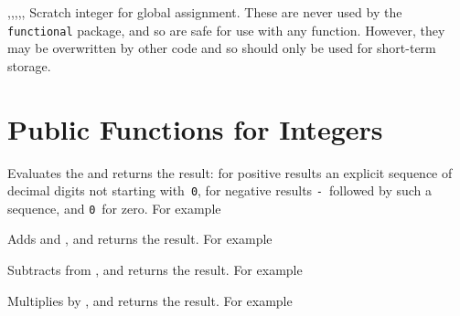\documentclass[oneside]{book}
\begin{document}
\begin{variable}{\gTmpaInt,\gTmpbInt,\gTmpcInt,\gTmpiInt,\gTmpjInt,\gTmpkInt}
Scratch integer for global assignment. These are never used by
the \verb!functional! package, and so are safe for use with any
function. However, they may be overwritten by other
code and so should only be used for short-term storage.
\end{variable}

\section{Public Functions for Integers}

\begin{function}{\IntEval}
\begin{syntax}
 
\end{syntax}
Evaluates the  and returns the result:
for positive results an
explicit sequence of decimal digits not starting with~\texttt{0},
for negative results \texttt{-}~followed by such a sequence, and
\texttt{0}~for zero. For example
\begin{demo}
\end{demo}
\end{function}

\begin{function}{\IntMathAdd}
\begin{syntax}
  
\end{syntax}
Adds  and ,
and returns the result. For example
\begin{demo}
\end{demo}
\end{function}

\begin{function}{\IntMathSub}
\begin{syntax}
  
\end{syntax}
Subtracts  from ,
and returns the result. For example
\begin{demo}
\end{demo}
\end{function}

\begin{function}{\IntMathMult}
\begin{syntax}
  
\end{syntax}
Multiplies  by ,
and returns the result. For example
\begin{demo}
\end{demo}
\end{function}
\end{document}
